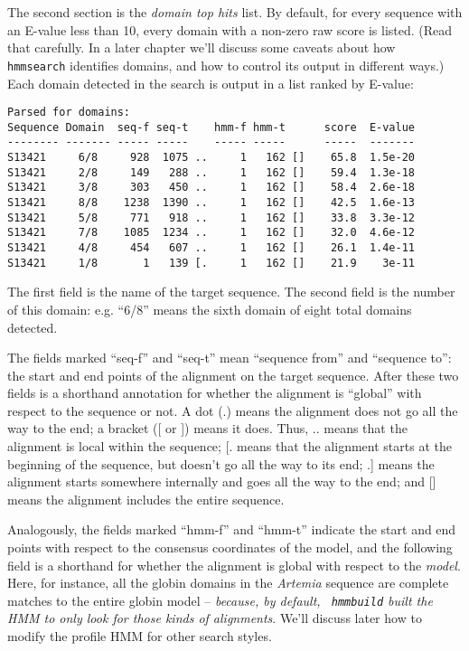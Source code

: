 \documentclass[11pt]{report}
\newcommand{\prog}[1]{\texttt{#1}}
\begin{document}
The second section is the {\em domain top hits} list. By default, for
every sequence with an E-value less than 10, every domain with a
non-zero raw score is listed. (Read that carefully. In a later chapter
we'll discuss some caveats about how \prog{ hmmsearch} identifies
domains, and how to control its output in different ways.) Each domain
detected in the search is output in a list ranked by E-value:

{\small\begin{verbatim}
Parsed for domains:
Sequence Domain  seq-f seq-t    hmm-f hmm-t      score  E-value
-------- ------- ----- -----    ----- -----      -----  -------
S13421     6/8     928  1075 ..     1   162 []    65.8  1.5e-20
S13421     2/8     149   288 ..     1   162 []    59.4  1.3e-18
S13421     3/8     303   450 ..     1   162 []    58.4  2.6e-18
S13421     8/8    1238  1390 ..     1   162 []    42.5  1.6e-13
S13421     5/8     771   918 ..     1   162 []    33.8  3.3e-12
S13421     7/8    1085  1234 ..     1   162 []    32.0  4.6e-12
S13421     4/8     454   607 ..     1   162 []    26.1  1.4e-11
S13421     1/8       1   139 [.     1   162 []    21.9    3e-11
\end{verbatim}}

The first field is the name of the target sequence. The second field
is the number of this domain: e.g. ``6/8'' means the sixth domain of
eight total domains detected. 

The fields marked ``seq-f'' and ``seq-t'' mean ``sequence from'' and
``sequence to'': the start and end points of the alignment on the
target sequence. After these two fields is a shorthand annotation for
whether the alignment is ``global'' with respect to the sequence or
not. A dot (.) means the alignment does not go all the way to the end;
a bracket ([ or ]) means it does. Thus, .. means that the alignment is
local within the sequence; [. means that the alignment starts at the
beginning of the sequence, but doesn't go all the way to its end; .]
means the alignment starts somewhere internally and goes all the way
to the end; and [] means the alignment includes the entire sequence.

Analogously, the fields marked ``hmm-f'' and ``hmm-t'' indicate the
start and end points with respect to the consensus coordinates of the
model, and the following field is a shorthand for whether the
alignment is global with respect to the {\em model}. Here, for
instance, all the globin domains in the {\em Artemia} sequence are
complete matches to the entire globin model -- {\em because, by
default, \prog{ hmmbuild} built the HMM to only look for those kinds of
alignments}. We'll discuss later how to modify the profile HMM for
other search styles.
\end{document}
